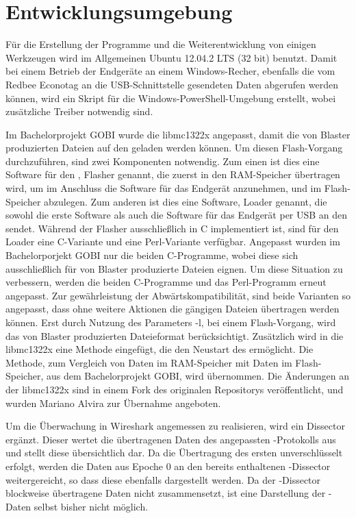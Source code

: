 \section{Entwicklungsumgebung}

Für die Erstellung der Programme und die Weiterentwicklung von einigen Werkzeugen wird im Allgemeinen Ubuntu 12.04.2 LTS (32 bit) benutzt.
Damit bei einem Betrieb der Endgeräte an einem Windows-Recher, ebenfalls die vom Redbee Econotag an die USB-Schnittstelle gesendeten
Daten abgerufen werden können, wird ein Skript für die Windows-PowerShell-Umgebung erstellt, wobei zusätzliche Treiber notwendig sind.

Im Bachelorprojekt GOBI wurde die libmc1322x \cite{libmc1322x} angepasst, damit die von Blaster produzierten Dateien auf den
 geladen werden können. Um diesen Flash-Vorgang durchzuführen, sind zwei Komponenten notwendig. Zum einen ist dies eine
Software für den , Flasher genannt, die zuerst in den RAM-Speicher übertragen wird, um im Anschluss die Software für
das Endgerät anzunehmen, und im Flash-Speicher abzulegen. Zum anderen ist dies eine Software, Loader genannt, die sowohl die erste
Software als auch die Software für das Endgerät per USB an den  sendet. Während der Flasher ausschließlich in C
implementiert ist, sind für den Loader eine C-Variante und eine Perl-Variante verfügbar. Angepasst wurden im Bachelorporjekt GOBI
nur die beiden C-Programme, wobei diese sich ausschließlich für von Blaster produzierte Dateien eignen. Um diese Situation zu verbessern,
werden die beiden C-Programme und das Perl-Programm erneut angepasst. Zur gewährleistung der Abwärtskompatibilität, sind beide Varianten
so angepasst, dass ohne weitere Aktionen die gängigen Dateien übertragen werden können. Erst durch Nutzung des Parameters -l, bei einem
Flash-Vorgang, wird das von Blaster produzierten Dateieformat berücksichtigt. Zusätzlich wird in die libmc1322x eine Methode eingefügt,
die den Neustart des  ermöglicht. Die Methode, zum Vergleich von Daten im RAM-Speicher mit Daten im Flash-Speicher, aus dem
Bachelorprojekt GOBI, wird übernommen. Die Änderungen an der libmc1322x sind in einem Fork des originalen Repositorys veröffentlicht,
und wurden Mariano Alvira zur Übernahme angeboten.

Um die Überwachung in Wireshark \cite{wireshark} angemessen zu realisieren, wird ein Dissector ergänzt. Dieser wertet die übertragenen
Daten des angepassten -Protokolls aus und stellt diese übersichtlich dar. Da die Übertragung des ersten 
unverschlüsselt erfolgt, werden die Daten aus Epoche 0 an den bereits enthaltenen -Dissector weitergereicht, so dass
diese ebenfalls dargestellt werden. Da der -Dissector blockweise übertragene Daten nicht zusammensetzt, ist eine Darstellung
der -Daten selbst bisher nicht möglich.

